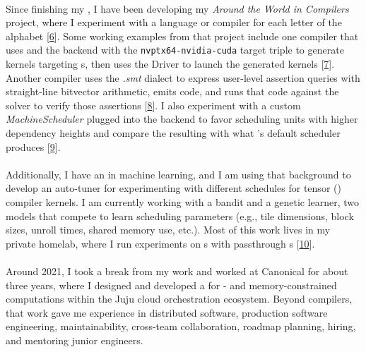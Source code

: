 \paragraph{} %
Since finishing my , I have been developing my \emph{Around the World in Compilers} project, where I experiment with a language or compiler for each letter of the alphabet [\href{\atwurl}{6}]. Some working examples from that project include one compiler that uses  and the  backend with the \texttt{nvptx64-nvidia-cuda} target triple to generate  kernels targeting  s, then uses the  Driver  to launch the generated kernels [\href{\cairolang}{7}]. Another compiler uses the \emph{.smt} dialect to express user-level assertion queries with straight-line bitvector arithmetic, emits \emph{} code, and runs that code against the \emph{}  solver to verify those assertions [\href{\dublinlang}{8}]. I also experiment with a custom \emph{MachineScheduler} plugged into the  backend to favor scheduling units with higher dependency heights and compare the resulting  with what 's default scheduler produces [\href{\edinlang}{9}].

\paragraph{} %
Additionally, I have an  in machine learning, and I am using that background to develop an auto-tuner for experimenting with different schedules for tensor () compiler kernels. I am currently working with a bandit and a genetic learner, two models that compete to learn scheduling parameters (e.g., tile dimensions, block sizes, unroll times, shared memory use, etc.). Most of this work lives in my private homelab, where I run experiments on s with passthrough  s [\href{\homelaburl}{10}].

\paragraph{} %
Around 2021, I took a break from my  work and worked at Canonical for about three years, where I designed and developed a  for - and memory-constrained computations within the Juju cloud orchestration ecosystem. Beyond compilers, that work gave me experience in distributed software, production software engineering, maintainability, cross-team collaboration, roadmap planning, hiring, and mentoring junior engineers.

